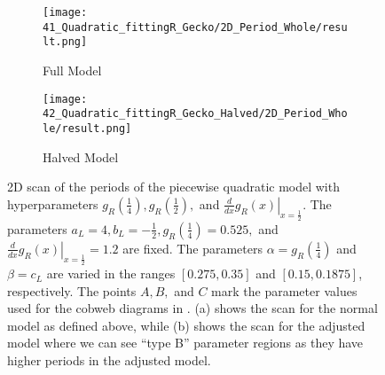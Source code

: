 \begin{figure}
	\centering
	\begin{subfigure}{0.4\textwidth}
		\centering
		\texttt{[image: 41\_Quadratic\_fittingR\_Gecko/2D\_Period\_Whole/result.png]}
		\caption{Full Model}
		\label{fig:setup.quad.hyper.2.period.full}
	\end{subfigure}
	\begin{subfigure}{0.4\textwidth}
		\centering
		\texttt{[image: 42\_Quadratic\_fittingR\_Gecko\_Halved/2D\_Period\_Whole/result.png]}
		\caption{Halved Model}
		\label{fig:setup.quad.hyper.2.period.halved}
	\end{subfigure}
	\caption[2D scan of the periods of the quadratic model with hyperparameters for different values of the fixed parameters]{
	2D scan of the periods of the piecewise quadratic model with hyperparameters $g_R\left(\frac{1}{4}\right), g_R\left(\frac{1}{2}\right),$ and $\left. \frac{d}{dx} g_R\left(x\right) \right|_{x = \frac{1}{2}}$.
	The parameters $a_L = 4, b_L = -\frac{1}{2}, g_R\left(\frac{1}{4}\right) = 0.525,$ and $\left. \frac{d}{dx} g_R\left(x\right) \right|_{x = \frac{1}{2}} = 1.2$ are fixed.
	The parameters $\alpha = g_R\left(\frac{1}{4}\right)$ and $\beta = c_L$ are varied in the ranges $[0.275, 0.35]$ and $[0.15, 0.1875]$, respectively.
	The points $A, B,$ and $C$ mark the parameter values used for the cobweb diagrams in .
	(a) shows the scan for the normal model as defined above, while (b) shows the scan for the adjusted model where we can see ``type B'' parameter regions as they have higher periods in the adjusted model.
	}
	\label{fig:setup.quad.hyper.2.period}
\end{figure}

